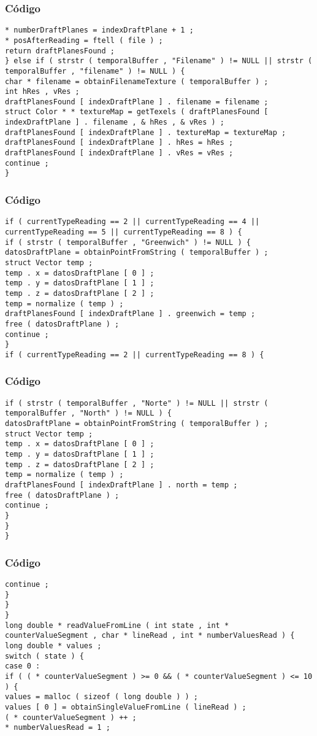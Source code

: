 \documentclass{beamer}
\begin{document}
\begin{frame}[fragile]
\frametitle{C\'odigo}
\begin{verbatim}
* numberDraftPlanes = indexDraftPlane + 1 ; 
* posAfterReading = ftell ( file ) ; 
return draftPlanesFound ; 
} else if ( strstr ( temporalBuffer , "Filename" ) != NULL || strstr ( temporalBuffer , "filename" ) != NULL ) { 
char * filename = obtainFilenameTexture ( temporalBuffer ) ; 
int hRes , vRes ; 
draftPlanesFound [ indexDraftPlane ] . filename = filename ; 
struct Color * * textureMap = getTexels ( draftPlanesFound [ indexDraftPlane ] . filename , & hRes , & vRes ) ; 
draftPlanesFound [ indexDraftPlane ] . textureMap = textureMap ; 
draftPlanesFound [ indexDraftPlane ] . hRes = hRes ; 
draftPlanesFound [ indexDraftPlane ] . vRes = vRes ; 
continue ; 
} 
\end{verbatim}
\end{frame}
\begin{frame}[fragile]
\frametitle{C\'odigo}
\begin{verbatim}
if ( currentTypeReading == 2 || currentTypeReading == 4 || currentTypeReading == 5 || currentTypeReading == 8 ) { 
if ( strstr ( temporalBuffer , "Greenwich" ) != NULL ) { 
datosDraftPlane = obtainPointFromString ( temporalBuffer ) ; 
struct Vector temp ; 
temp . x = datosDraftPlane [ 0 ] ; 
temp . y = datosDraftPlane [ 1 ] ; 
temp . z = datosDraftPlane [ 2 ] ; 
temp = normalize ( temp ) ; 
draftPlanesFound [ indexDraftPlane ] . greenwich = temp ; 
free ( datosDraftPlane ) ; 
continue ; 
} 
if ( currentTypeReading == 2 || currentTypeReading == 8 ) { 
\end{verbatim}
\end{frame}
\begin{frame}[fragile]
\frametitle{C\'odigo}
\begin{verbatim}
if ( strstr ( temporalBuffer , "Norte" ) != NULL || strstr ( temporalBuffer , "North" ) != NULL ) { 
datosDraftPlane = obtainPointFromString ( temporalBuffer ) ; 
struct Vector temp ; 
temp . x = datosDraftPlane [ 0 ] ; 
temp . y = datosDraftPlane [ 1 ] ; 
temp . z = datosDraftPlane [ 2 ] ; 
temp = normalize ( temp ) ; 
draftPlanesFound [ indexDraftPlane ] . north = temp ; 
free ( datosDraftPlane ) ; 
continue ; 
} 
} 
} 
\end{verbatim}
\end{frame}
\begin{frame}[fragile]
\frametitle{C\'odigo}
\begin{verbatim}
continue ; 
} 
} 
} 
long double * readValueFromLine ( int state , int * counterValueSegment , char * lineRead , int * numberValuesRead ) { 
long double * values ; 
switch ( state ) { 
case 0 : 
if ( ( * counterValueSegment ) >= 0 && ( * counterValueSegment ) <= 10 ) { 
values = malloc ( sizeof ( long double ) ) ; 
values [ 0 ] = obtainSingleValueFromLine ( lineRead ) ; 
( * counterValueSegment ) ++ ; 
* numberValuesRead = 1 ; 
\end{verbatim}
\end{frame}
\end{document}
